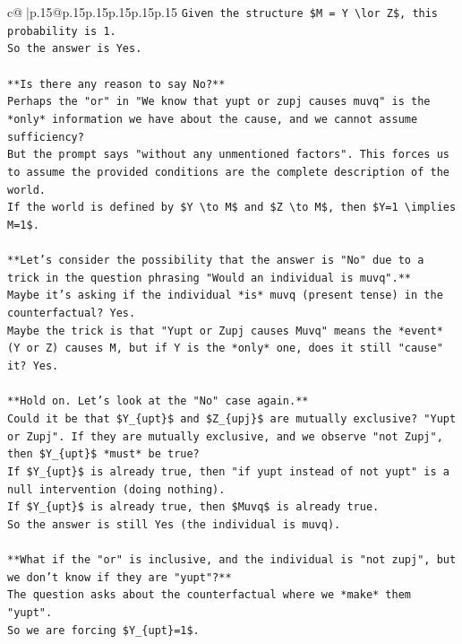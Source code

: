 \documentclass{article}
\begin{document}
{\begin{supertabular}{c@{$\;$}|p{.15\linewidth}@{}p{.15\linewidth}p{.15\linewidth}p{.15\linewidth}p{.15\linewidth}p{.15\linewidth}}
{{{\texttt{Given the structure \$M = Y \textbackslash{}lor Z\$, this probability is 1.} \\
\texttt{So the answer is Yes.} \\
\\ 
\texttt{**Is there any reason to say No?**} \\
\texttt{Perhaps the "or" in "We know that yupt or zupj causes muvq" is the *only* information we have about the cause, and we cannot assume sufficiency?} \\
\texttt{But the prompt says "without any unmentioned factors". This forces us to assume the provided conditions are the complete description of the world.} \\
\texttt{If the world is defined by \$Y \textbackslash{}to M\$ and \$Z \textbackslash{}to M\$, then \$Y=1 \textbackslash{}implies M=1\$.} \\
\\ 
\texttt{**Let's consider the possibility that the answer is "No" due to a trick in the question phrasing "Would an individual is muvq".**} \\
\texttt{Maybe it's asking if the individual *is* muvq (present tense) in the counterfactual? Yes.} \\
\texttt{Maybe the trick is that "Yupt or Zupj causes Muvq" means the *event* (Y or Z) causes M, but if Y is the *only* one, does it still "cause" it? Yes.} \\
\\ 
\texttt{**Hold on. Let's look at the "No" case again.**} \\
\texttt{Could it be that \$Y\_\{upt\}\$ and \$Z\_\{upj\}\$ are mutually exclusive? "Yupt or Zupj". If they are mutually exclusive, and we observe "not Zupj", then \$Y\_\{upt\}\$ *must* be true?} \\
\texttt{If \$Y\_\{upt\}\$ is already true, then "if yupt instead of not yupt" is a null intervention (doing nothing).} \\
\texttt{If \$Y\_\{upt\}\$ is already true, then \$Muvq\$ is already true.} \\
\texttt{So the answer is still Yes (the individual is muvq).} \\
\\ 
\texttt{**What if the "or" is inclusive, and the individual is "not zupj", but we don't know if they are "yupt"?**} \\
\texttt{The question asks about the counterfactual where we *make* them "yupt".} \\
\texttt{So we are forcing \$Y\_\{upt\}=1\$.} \\
}}}
\end{supertabular}}
\end{document}
